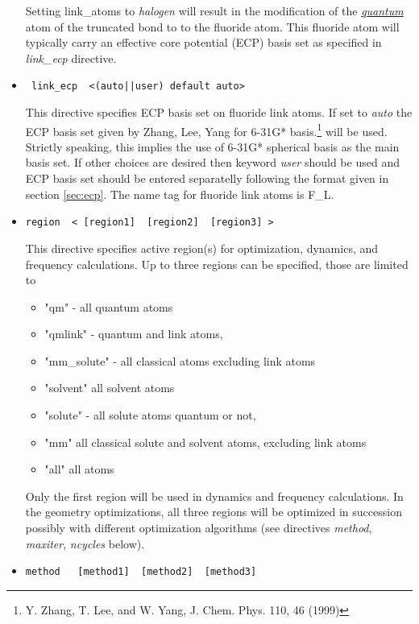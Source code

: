 \begin{itemize}
Setting link{\_}atoms to {\it halogen } will result in the modification of the {\it \underline{quantum}} 
atom of the truncated bond to 
to the fluoride atom. This fluoride atom will typically carry an effective core potential (ECP) basis set as specified
in {\it link{\_}ecp} directive.

\item
\begin{verbatim}
 link_ecp  <(auto||user) default auto> 
\end{verbatim}
This directive specifies ECP basis set on fluoride link atoms. If set to {\it auto } 
the ECP basis set given by Zhang, Lee, Yang for 6-31G* basis.\footnote{Y. Zhang, T. Lee, and W. Yang, J. Chem. Phys. 110, 46 (1999)} 
will be used. Strictly speaking, this implies the use of 6-31G* spherical basis as the main basis set. 
If other choices are desired then keyword {\it user } should be used and ECP basis set should be entered separatelly 
following the format given in
section \ref{sec:ecp}. 
The name tag for fluoride link atoms is F{\_}L. 

\item
\begin{verbatim}
region  < [region1]  [region2]  [region3] >
\end{verbatim}

This directive specifies active region(s) for optimization, dynamics, and frequency calculations.
Up to three regions can be specified, those are limited to 
\begin{itemize}
\item
"qm" - all quantum atoms
\item
"qmlink" - quantum and link atoms,
\item
"mm{\_}solute" - all classical atoms excluding link atoms
\item
"solvent" all solvent atoms
\item
"solute" - all solute atoms quantum or not,
\item
"mm" all classical solute and solvent atoms, excluding link atoms
\item
"all" all atoms 
\end{itemize}
Only the first region will be used in dynamics and frequency calculations. In the geometry optimizations, all three regions will
be optimized in succession possibly with different optimization algorithms (see directives {\it method},  {\it maxiter},
{\it ncycles} below).

\item
\begin{verbatim}
method   [method1]  [method2]  [method3]
\end{verbatim}


\end{itemize}

